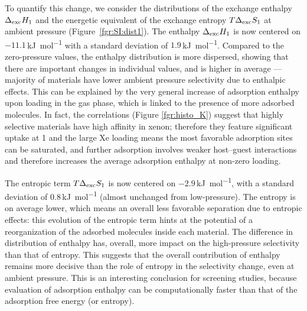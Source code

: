 \documentclass[main.tex]{subfiles}
\begin{document}
To quantify this change, we consider the distributions of the exchange enthalpy $\Delta_{\text{exc}}H_{\text{1}}$ and the energetic equivalent of the exchange entropy $T\Delta_{\text{exc}}S_{\text{1}}$ at ambient pressure (Figure~\ref{fgr:SI:dist1}). The enthalpy $\Delta_{\text{exc}}H_{\text{1}}$ is now centered on $-11.1$\,\si{\kilo\joule\per\mol} with a standard deviation of $1.9$\,\si{\kilo\joule\per\mol}. Compared to the zero-pressure values, the enthalpy distribution is more dispersed, showing that there are important changes in individual values, and is higher in average --- majority of materials have lower ambient pressure selectivity due to enthalpic effects. This can be explained by the very general increase of adsorption enthalpy upon loading in the gas phase, which is linked to the presence of more adsorbed molecules. In fact, the correlations (Figure \ref{fgr:histo_K}) suggest that highly selective materials have high affinity in xenon; therefore they feature significant uptake at \SI{1}{\atm} and the large Xe loading means the most favorable adsorption sites can be saturated, and further adsorption involves weaker host--guest interactions and therefore increases the average adsorption enthalpy at non-zero loading.

The entropic term $T\Delta_{\text{exc}}S_{\text{1}}$ is now centered on $-2.9$\,\si{\kilo\joule\per\mol}, with a standard deviation of $0.8$\,\si{\kilo\joule\per\mol} (almost unchanged from low-pressure). The entropy is on average lower, which means an overall less favorable separation due to entropic effects: this evolution of the entropic term hints at the potential of a reorganization of the adsorbed molecules inside each material. The difference in distribution of enthalpy has, overall, more impact on the high-pressure selectivity than that of entropy. This suggests that the overall contribution of enthalpy remains more decisive than the role of entropy in the selectivity change, even at ambient pressure. This is an interesting conclusion for screening studies, because evaluation of adsorption enthalpy can be computationally faster than that of the adsorption free energy (or entropy).
\end{document}
